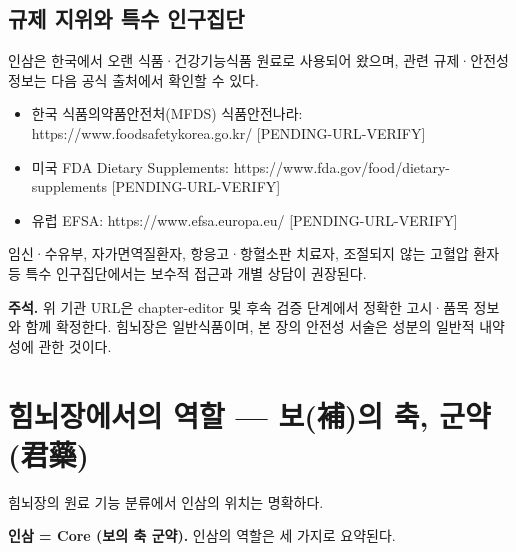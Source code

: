 \documentclass[11pt,oneside]{book}
\newenvironment{authnote}
  {\par\smallskip\begingroup\leftskip=7mm\rightskip=5mm\small\color{muted}\noindent\ignorespaces}
  {\par\endgroup\smallskip}
\begin{document}
\subsection{규제 지위와 특수 인구집단}
인삼은 한국에서 오랜 식품·건강기능식품 원료로 사용되어 왔으며, 관련 규제·안전성 정보는 다음 공식 출처에서 확인할 수 있다.

\begin{itemize}[leftmargin=6mm,itemsep=1pt,topsep=2pt]
  \item 한국 식품의약품안전처(MFDS) 식품안전나라: https://www.foodsafetykorea.go.kr/ [PENDING-URL-VERIFY]
  \item 미국 FDA Dietary Supplements: https://www.fda.gov/food/dietary-supplements [PENDING-URL-VERIFY]
  \item 유럽 EFSA: https://www.efsa.europa.eu/ [PENDING-URL-VERIFY]
\end{itemize}
임신·수유부, 자가면역질환자, 항응고·항혈소판 치료자, 조절되지 않는 고혈압 환자 등 특수 인구집단에서는 보수적 접근과 개별 상담이 권장된다.

\begin{authnote}\textbf{주석.} 위 기관 URL은 chapter-editor 및 후속 검증 단계에서 정확한 고시·품목 정보와 함께 확정한다. 힘뇌장은 일반식품이며, 본 장의 안전성 서술은 성분의 일반적 내약성에 관한 것이다.\end{authnote}
\section{힘뇌장에서의 역할 — 보(補)의 축, 군약(君藥)}
힘뇌장의 원료 기능 분류에서 인삼의 위치는 명확하다.

\vspace{2pt}\vspace{3pt}

\textbf{인삼 = Core (보의 축 군약).} 인삼의 역할은 세 가지로 요약된다.
\end{document}
